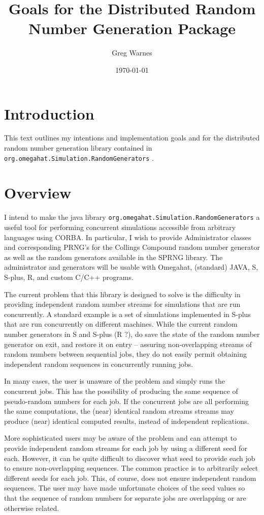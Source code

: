 \documentclass{article}
\title{Goals for the Distributed Random Number Generation Package}
\author{Greg Warnes}
\date{\today}
\begin{document}
\maketitle

\section{Introduction}

This text outlines my intentions and implementation goals and for the
distributed random number generation library contained in
\verb+org.omegahat.Simulation.RandomGenerators+ .

\section{Overview}

I intend to make the java library
\verb+org.omegahat.Simulation.RandomGenerators+  a useful tool for
performing concurrent simulations accessible from arbitrary languages
using CORBA.  In particular, I wish to provide Administrator classes
and corresponding PRNG's for the Collings Compound random number
generator as well as the random generators available in the SPRNG
library.  The administrator and generators will be usable with
Omegahat, (standard) JAVA, S, S-plus, R, and custom C/C++ programs.

The current problem that this library is designed to solve is the
difficulty in providing independent random number streams for
simulations that are run concurrently.  A standard example is a set of
simulations implemented in S-plus that are run concurrently on
different machines.  While the current random number generators in S
and S-plus (R ?), do save the state of the random number generator on
exit, and restore it on entry -- assuring non-overlapping streams of
random numbers between sequential jobs, they do not easily permit
obtaining independent random sequences in concurrently running jobs.

In many cases, the user is unaware of the problem and simply runs the
concurrent jobs.  This has the possibility of producing the same
sequence of pseudo-random numbers for each job.  If the concurrent
jobs are all performing the same computations, the (near) identical
random streams streams may produce (near) identical computed results,
instead of independent replications.

More sophisticated users may be aware of the problem and can attempt
to provide independent random streams for each job by using a
different seed for each.  However, it can be quite difficult to
discover what seed to provide each job to ensure non-overlapping
sequences.  The common practice is to arbitrarily select different
seeds for each job.  This, of course, does not ensure independent
random sequences.  The user may have made unfortunate choices of the
seed values so that the sequence of random numbers for separate jobs
are overlapping or are otherwise related.
\end{document}
